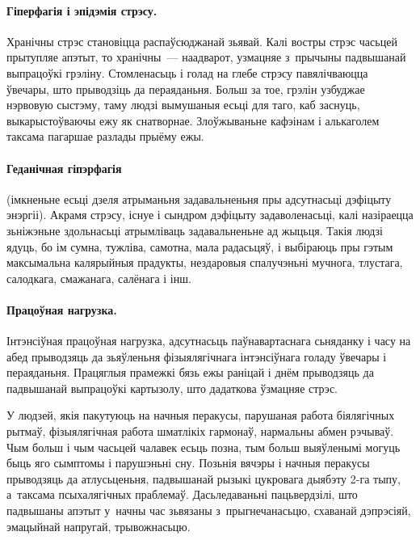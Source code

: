 \paragraph{Гіперфагія і эпідэмія стрэсу.}
Хранічны стрэс становіцца распаўсюджанай зьявай. Калі востры стрэс часьцей прытупляе апэтыт, то хранічны~--- наадварот, узмацняе з~прычыны падвышанай выпрацоўкі грэліну. Стомленасьць і голад на глебе стрэсу павялічваюцца ўвечары, што прыводзіць да пераяданьня. Больш за тое, грэлін узбуджае нэрвовую сыстэму, таму людзі вымушаныя есьці для таго, каб заснуць, выкарыстоўваючы ежу як снатворнае. Злоўжываньне кафэінам і алькаголем таксама пагаршае разлады прыёму ежы.

\paragraph{Геданічная гіпэрфагія} (імкненьне есьці дзеля атрыманьня задавальненьня пры адсутнасьці дэфіцыту энэргіі).
Акрамя стрэсу, існуе і сындром дэфіцыту задаволенасьці, калі назіраецца зьніжэньне здольнасьці атрымліваць задавальненьне ад жыцьця. Такія людзі ядуць, бо ім сумна, тужліва, самотна, мала радасьцяў, і выбіраюць пры гэтым максымальна калярыйныя прадукты, нездаровыя спалучэньні мучнога, тлустага, салодкага, смажанага, салёнага і інш.


\paragraph{Працоўная нагрузка.}
Інтэнсіўная працоўная нагрузка, адсутнасьць паўнавартаснага сьняданку і часу на абед прыводзяць да зьяўленьня фізыялягічнага інтэнсіўнага голаду ўвечары і пераяданьня. Працяглыя прамежкі бязь ежы раніцай і днём прыводзяць да падвышанай выпрацоўкі картызолу, што дадаткова ўзмацняе стрэс.

У людзей, якія пакутуюць на начныя перакусы, парушаная работа біялягічных рытмаў, фізыялягічная работа шматлікіх гармонаў, нармальны абмен рэчываў. Чым больш і чым часьцей чалавек есьць позна, тым больш выяўленымі могуць быць яго сымптомы і парушэньні сну. Позьнія вячэры і начныя перакусы прыводзяць да атлусьценьня, падвышанай рызыкі цукровага дыябэту 2-га тыпу, а~таксама псыхалягічных праблемаў. Дасьледаваньні пацьвердзілі, што падвышаны апэтыт у~начны час зьвязаны з~прыгнечанасьцю, схаванай дэпрэсіяй, эмацыйнай напругай, трывожнасьцю.

